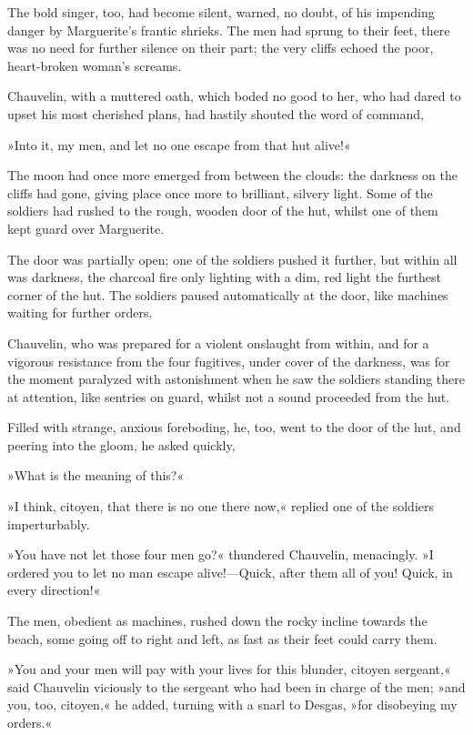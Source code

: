 The bold singer, too, had become silent, warned, no doubt, of his impending danger by Marguerite's frantic shrieks. The men had sprung to their feet, there was no need for further silence on their part; the very cliffs echoed the poor, heart-broken woman's screams.

Chauvelin, with a muttered oath, which boded no good to her, who had dared to upset his most cherished plans, had hastily shouted the word of command,\longdash


»Into it, my men, and let no one escape from that hut alive!«

The moon had once more emerged from between the clouds: the darkness on the cliffs had gone, giving place once more to brilliant, silvery light. Some of the soldiers had rushed to the rough, wooden door of the hut, whilst one of them kept guard over Marguerite.

The door was partially open; one of the soldiers pushed it further, but within all was darkness, the charcoal fire only lighting with a dim, red light the furthest corner of the hut. The soldiers paused automatically at the door, like machines waiting for further orders.

Chauvelin, who was prepared for a violent onslaught from within, and for a vigorous resistance from the four fugitives, under cover of the darkness, was for the moment paralyzed with astonishment when he saw the soldiers standing there at attention, like sentries on guard, whilst not a sound proceeded from the hut.

Filled with strange, anxious foreboding, he, too, went to the door of the hut, and peering into the gloom, he asked quickly,\longdash


»What is the meaning of this?«

»I think, citoyen, that there is no one there now,« replied one of the soldiers imperturbably.

»You have not let those four men go?« thundered Chauvelin, menacingly. »I ordered you to let no man escape alive!\allowbreak---\allowbreak Quick, after them all of you! Quick, in every direction!«

The men, obedient as machines, rushed down the rocky incline towards the beach, some going off to right and left, as fast as their feet could carry them.

»You and your men will pay with your lives for this blunder, citoyen sergeant,« said Chauvelin viciously to the sergeant who had been in charge of the men; »and you, too, citoyen,« he added, turning with a snarl to Desgas, »for disobeying my orders.«

